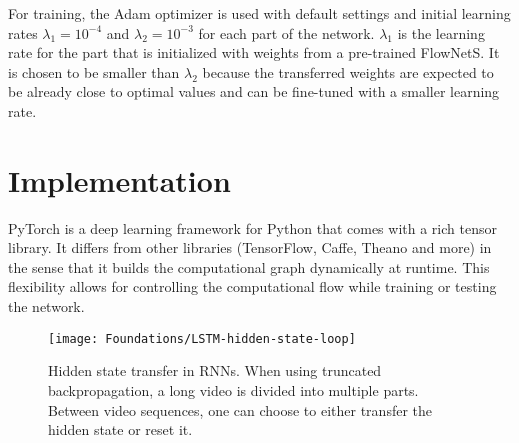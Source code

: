 			
			For training, the Adam optimizer is used with default settings and initial learning rates $\lambda_1 = 10^{-4}$ and $\lambda_2 = 10^{-3}$ for each part of the network.
			$\lambda_1$ is the learning rate for the part that is initialized with weights from a pre-trained FlowNetS.
			It is chosen to be smaller than $\lambda_2$ because the transferred weights are expected to be already close to optimal values and can be fine-tuned with a smaller learning rate.
			
			
			
	\section{Implementation}
		PyTorch is a deep learning framework for Python that comes with a rich tensor library.
		It differs from other libraries (TensorFlow, Caffe, Theano and more) in the sense that it builds the computational graph dynamically at runtime.
		This flexibility allows for controlling the computational flow while training or testing the network.
		
		
		\begin{figure}[t]
			\centering
			\texttt{[image: Foundations/LSTM-hidden-state-loop]}
			\caption[Hidden state transfer in RNNs]
					{Hidden state transfer in RNNs. 
					 When using truncated backpropagation, a long video is divided into multiple parts.
					 Between video sequences, one can choose to either transfer the hidden state or reset it.
					 \label{fig:LSTM-ways-to-use-hidden-state}}
		\end{figure}

